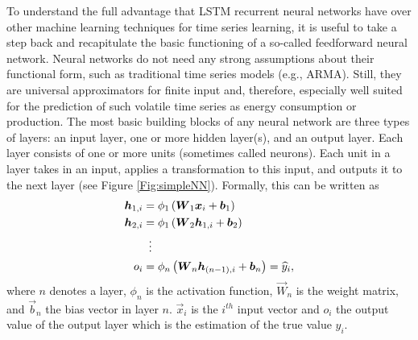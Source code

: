 To understand the full advantage that LSTM recurrent neural networks have over other machine learning techniques for time series learning, it is useful to take a step back and recapitulate the basic functioning of a so-called feedforward neural network. Neural networks do not need any strong assumptions about their functional form, such as traditional time series models (e.g., ARMA). Still, they are universal approximators for finite input \citep{Hornik:1989} and, therefore, especially well suited for the prediction of such volatile time series as energy consumption or production. The most basic building blocks of any neural network are three types of layers: an input layer, one or more hidden layer(s), and an output layer. Each layer consists of one or more units (sometimes called neurons). Each unit in a layer takes in an input, applies a transformation to this input, and outputs it to the next layer (see Figure \ref{Fig:simpleNN}). Formally, this can be written as
%
\begin{equation} \label{Eq:feedforward}
\begin{split}
    \vec{h}_{1,i}&=\phi_1\left(\vec{W}_1\vec{x}_i+\vec{b}_1\right)\\
    \vec{h}_{2,i}&=\phi_1\left(\vec{W}_2\vec{h}_{1,i}+\vec{b}_2\right)\\
    &\setbox0\hbox{=}\mathrel{\makebox[\wd0]{\hfil\vdots\hfil}}\\
    o_i&=\phi_n\left(\vec{W}_n\vec{h}_{(n-1),i}+\vec{b}_n\right)=\widehat{y}_i,
\end{split}
\end{equation}
%
where $n$ denotes a layer, $\phi_n$ is the activation function, $\vec{W}_n$ is the weight matrix, and $\vec{b}_n$ the bias vector in layer $n$. $\vec{x}_i$ is the $i^{th}$ input vector and $o_i$ the output value of the output layer which is the estimation of the true value $y_i$.
%
